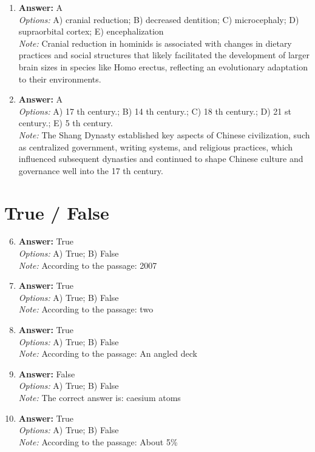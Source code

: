 \documentclass[12pt]{article}
\begin{document}
\begin{enumerate}[label=\arabic*.]
\item \textbf{Answer:} A
\\ \textit{Options:} A) cranial reduction; B) decreased dentition; C) microcephaly; D) supraorbital cortex; E) encephalization
\\ \textit{Note:} Cranial reduction in hominids is associated with changes in dietary practices and social structures that likely facilitated the development of larger brain sizes in species like Homo erectus, reflecting an evolutionary adaptation to their environments.
\item \textbf{Answer:} A
\\ \textit{Options:} A) 17 th century.; B) 14 th century.; C) 18 th century.; D) 21 st century.; E) 5 th century.
\\ \textit{Note:} The Shang Dynasty established key aspects of Chinese civilization, such as centralized government, writing systems, and religious practices, which influenced subsequent dynasties and continued to shape Chinese culture and governance well into the 17 th century.
\end{enumerate}

\section*{True / False}
\begin{enumerate}[label=\arabic*.]
\setcounter{enumi}{5}
\item \textbf{Answer:} True
\\ \textit{Options:} A) True; B) False
\\ \textit{Note:} According to the passage: 2007
\item \textbf{Answer:} True
\\ \textit{Options:} A) True; B) False
\\ \textit{Note:} According to the passage: two
\item \textbf{Answer:} True
\\ \textit{Options:} A) True; B) False
\\ \textit{Note:} According to the passage: An angled deck
\item \textbf{Answer:} False
\\ \textit{Options:} A) True; B) False
\\ \textit{Note:} The correct answer is: caesium atoms
\item \textbf{Answer:} True
\\ \textit{Options:} A) True; B) False
\\ \textit{Note:} According to the passage: About 5\%
\end{enumerate}
\end{document}
